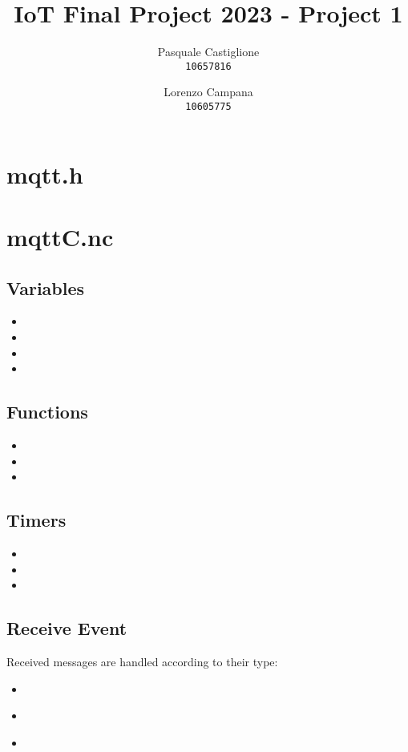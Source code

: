\documentclass[11pt]{article}
\title{\textbf{IoT Final Project 2023 - Project 1}}
\author{
  Pasquale Castiglione\\
	\texttt{10657816}
  \and
  Lorenzo Campana\\
  \texttt{10605775}
}
\date{}
\begin{document}
\maketitle
\section*{mqtt.h}
\section*{mqttC.nc}

\subsection*{Variables}
\begin{itemize}
  \item{\texttt{}}
  \item{\texttt{}}
  \item{\texttt{}}
  \item{\texttt{}}
\end{itemize}

\subsection*{Functions}
\begin{itemize}
  \item{\texttt{}}
  \item{\texttt{}}
  \item{\texttt{}}
\end{itemize}

\subsection*{Timers}
\begin{itemize}
  \item{\texttt{}}
  \item{\texttt{}}
  \item{\texttt{}}
\end{itemize}

\subsection*{Receive Event}
Received messages are handled according to their type:
\begin{itemize}
	\item{\textbf{}}
	\item{\textbf{}}
	\item{\textbf{}}
\end{itemize}
\end{document}
